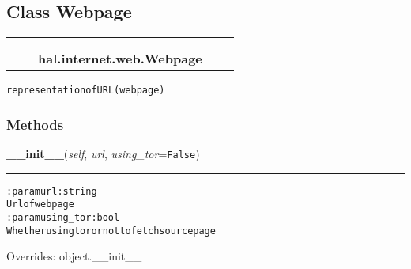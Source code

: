 
\subsection{Class Webpage}

    \label{hal:internet:web:Webpage}
\begin{tabular}{cccccc}
\multicolumn{2}{r}{\settowidth{\BCL}{object}\multirow{2}{\BCL}{object}}
&&
  \\\cline{3-3}
  &&\multicolumn{1}{c|}{}
&&
  \\
&&\multicolumn{2}{l}{\textbf{hal.internet.web.Webpage}}
\end{tabular}

\begin{alltt}
representation of URL (web page)
\end{alltt}



  \subsubsection{Methods}

    \vspace{0.5ex}

\hspace{.8\funcindent}\begin{boxedminipage}{\funcwidth}

    \raggedright \textbf{\_\_init\_\_}(\textit{self}, \textit{url}, \textit{using\_tor}={\tt False})

    \vspace{-1.5ex}

    \rule{\textwidth}{0.5\fboxrule}
\setlength{\parskip}{2ex}
\begin{alltt}

:param url: string
    Url of webpage
:param using\_tor: bool
    Whether using tor or not to fetch source page
\end{alltt}

\setlength{\parskip}{1ex}
      Overrides: object.\_\_init\_\_

    \end{boxedminipage}

